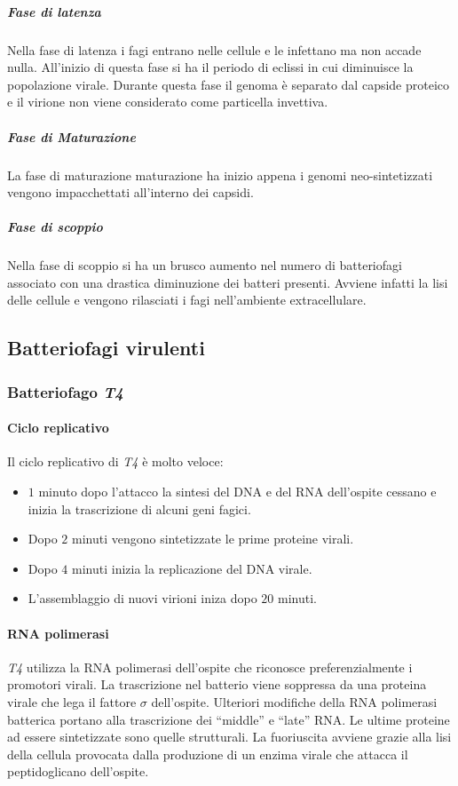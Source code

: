 				\subparagraph{Fase di latenza}
				Nella fase di latenza i fagi entrano nelle cellule e le infettano ma non accade nulla.
				All'inizio di questa fase si ha il periodo di eclissi in cui diminuisce la popolazione virale.
				Durante questa fase il genoma \`e separato dal capside proteico e il virione non viene considerato come particella invettiva.

				\subparagraph{Fase di Maturazione}
				La fase di maturazione maturazione ha inizio appena i genomi neo-sintetizzati vengono impacchettati all'interno dei capsidi.

				\subparagraph{Fase di scoppio}
				Nella fase di scoppio si ha un brusco aumento nel numero di batteriofagi associato con una drastica diminuzione dei batteri presenti.
				Avviene infatti la lisi delle cellule e vengono rilasciati i fagi nell'ambiente extracellulare.

	\subsection{Batteriofagi virulenti}

		\subsubsection{Batteriofago \emph{T4}}

			\paragraph{Ciclo replicativo}
			Il ciclo replicativo di \emph{T4} \`e molto veloce:
			\begin{multicols}{2}
				\begin{itemize}
    					\item $1$ minuto dopo l'attacco la sintesi del DNA e del RNA dell'ospite cessano e inizia la trascrizione di alcuni geni fagici.
    					\item Dopo $2$ minuti vengono sintetizzate le prime proteine virali.
    					\item Dopo $4$ minuti inizia la replicazione del DNA virale.
    					\item L'assemblaggio di nuovi virioni iniza dopo $20$ minuti. 
				\end{itemize}
			\end{multicols}

			\paragraph{RNA polimerasi}
			\emph{T4} utilizza la RNA polimerasi dell'ospite che riconosce preferenzialmente i promotori virali. 
			La trascrizione nel batterio viene soppressa da una proteina virale che lega il fattore $\sigma$ dell'ospite. 
			Ulteriori modifiche della RNA polimerasi batterica portano alla trascrizione dei ``middle'' e ``late'' RNA. 
			Le ultime proteine ad essere sintetizzate sono quelle strutturali. 
			La fuoriuscita avviene grazie alla lisi della cellula provocata dalla produzione di un enzima virale che attacca il peptidoglicano dell'ospite. 

